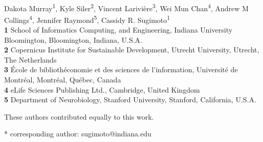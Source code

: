 \documentclass[10pt,letterpaper]{article}
\begin{document}
\vspace*{0.2in}

\begin{flushleft}
{\Large
\textbf{} %
}
\newline
\\
Dakota Murray\textsuperscript{1},
Kyle Siler\textsuperscript{2},
Vincent Larivière\textsuperscript{3},
Wei Mun Chan\textsuperscript{4},
Andrew M Collings\textsuperscript{4},
Jennifer Raymond\textsuperscript{5\Yingyang},
Cassidy R. Sugimoto\textsuperscript{1\Yinyang*}
\\
\bigskip
\textbf{1} School of Informatics Computing, and Engineering, Indiana University Bloomington, Bloomington, Indiana, U.S.A.
\\
\textbf{2} Copernicus Institute for Sustainable Development, Utrecht University, Utrecht, The Netherlands
\\
\textbf{3} École de bibliothéconomie et des sciences de l’information, Université de Montréal, Montréal, Québec, Canada
\\
\textbf{4} eLife Sciences Publishing Ltd., Cambridge, United Kingdom
\\
\textbf{5} Department of Neurobiology, Stanford University, Stanford, California, U.S.A.
\bigskip

% 
%
\Yinyang These authors contributed equally to this work.

* corresponding author: sugimoto@indiana.edu

\end{flushleft}
\end{document}
